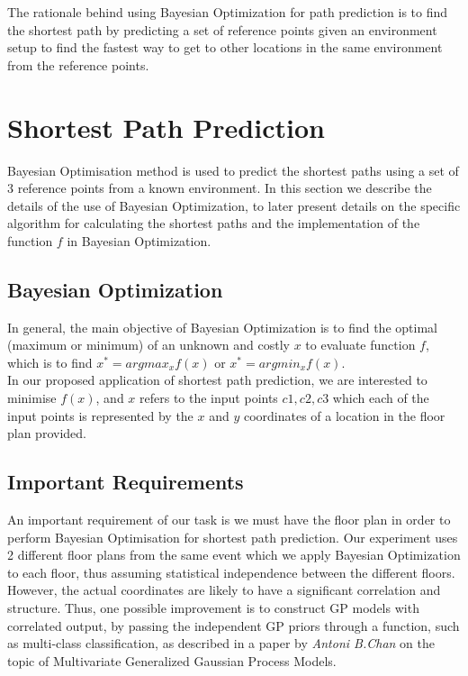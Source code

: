 \documentclass[letterpaper]{article}
\begin{document}
The rationale behind using Bayesian Optimization for path prediction is to find the shortest path by predicting a set of reference points given an environment setup to find the fastest way to get to other locations in the same environment from the reference points.

\section{Shortest Path Prediction}

Bayesian Optimisation method is used to predict the shortest paths using a set of $3$ reference points from a known environment. In this section we describe the details of the use of Bayesian Optimization, to later present details on the specific algorithm for calculating the shortest paths and the implementation of the function $f$ in Bayesian Optimization.

\subsection{Bayesian Optimization}

In general, the main objective of Bayesian Optimization is to find the optimal (maximum or minimum) of an unknown and costly $x$ to evaluate function $f$, which is to find $x^* = arg max_x f(x)$ or $x^* = arg min_x f(x)$. \\

In our proposed application of shortest path prediction, we are interested to minimise $f(x)$, and $x$ refers to the input points $c1, c2, c3$ which each of the input points is represented by the $x$ and $y$ coordinates of a location in the floor plan provided.   



\subsection{Important Requirements}

An important requirement of our task is we must have the floor plan in order to perform Bayesian Optimisation for shortest path prediction. Our experiment uses 2 different floor plans from the same event which we apply Bayesian Optimization to each floor, thus assuming statistical independence between the different floors. \\

However, the actual coordinates are likely to have a significant correlation and structure. Thus, one possible improvement is to construct GP models with correlated output, by passing the independent GP priors through a function, such as multi-class classification, as described in a paper by {\it Antoni B.Chan} on the topic of Multivariate Generalized Gaussian Process Models. \\
\end{document}
